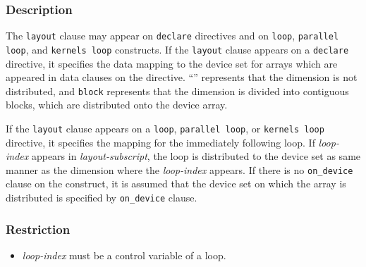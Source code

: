 \subsubsection*{Description}
The {\tt layout} clause may appear on {\tt declare} directives and on {\tt loop}, {\tt parallel loop}, and {\tt kernels loop} constructs.
If the {\tt layout} clause appears on a {\tt declare} directive, it specifies the data mapping to the device set for arrays which are appeared in data clauses on the directive.
``{\tt *}'' represents that the dimension is not distributed, and {\tt block} represents that the dimension is divided into contiguous blocks, which are distributed onto the device array.

If the {\tt layout} clause appears on a {\tt loop}, {\tt parallel loop}, or {\tt kernels loop} directive, it specifies the mapping for the immediately following loop.
If {\it loop-index} appears in {\it layout-subscript}, the loop is distributed to the device set as same manner as the dimension where the {\it loop-index} appears.
If there is no {\tt on\_device} clause on the construct, it is assumed that the device set on which the array is distributed is specified by {\tt on\_device} clause.

\subsubsection*{Restriction}
\begin{itemize}
\item {\it loop-index} must be a control variable of a loop. %
\end{itemize}


